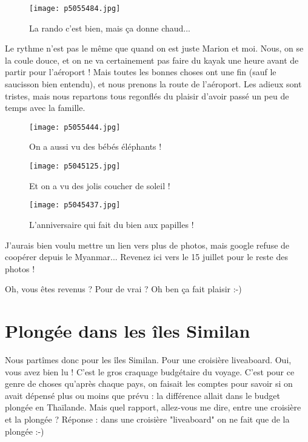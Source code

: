 \documentclass{book}
\begin{document}
\begin{figure}[h]
\centering
\texttt{[image: p5055484.jpg]}
\caption*{La rando c'est bien, mais ça donne chaud...}
\end{figure}

Le rythme n'est pas le même que quand on est juste Marion et moi. Nous, on se la coule douce, et on ne va certainement pas faire du kayak une heure avant de partir pour l'aéroport ! Mais toutes les bonnes choses ont une fin (sauf le saucisson bien entendu), et nous prenons la route de l'aéroport. Les adieux sont tristes, mais nous repartons tous regonflés du plaisir d'avoir passé un peu de temps avec la famille.


\begin{figure}[h]
\centering
\texttt{[image: p5055444.jpg]}
\caption*{On a aussi vu des bébés éléphants !}
\end{figure}


\begin{figure}[h]
\centering
\texttt{[image: p5045125.jpg]}
\caption*{Et on a vu des jolis coucher de soleil !}
\end{figure}


\begin{figure}[h]
\centering
\texttt{[image: p5045437.jpg]}
\caption*{L'anniversaire qui fait du bien aux papilles !}
\end{figure}

J'aurais bien voulu mettre un lien vers plus de photos, mais google refuse de coopérer depuis le Myanmar... Revenez ici vers le 15 juillet pour le reste des photos !

Oh, vous êtes revenus ? Pour de vrai ? Oh ben ça fait plaisir :-)



\chapter{Plongée dans les îles Similan}
Nous partîmes donc pour les îles Similan. Pour une croisière liveaboard. Oui, vous avez bien lu ! C'est le gros craquage budgétaire du voyage. C'est pour ce genre de choses qu'après chaque pays, on faisait les comptes pour savoir si on avait dépensé plus ou moins que prévu : la différence allait dans le budget plongée en Thaïlande. Mais quel rapport, allez-vous me dire, entre une croisière et la plongée ? Réponse : dans une croisière "liveaboard" on ne fait que de la plongée :-)
\end{document}
